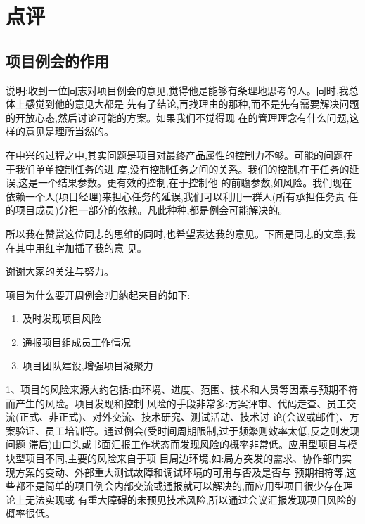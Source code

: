 \documentclass[11pt]{article}
\begin{document}
\pagebreak
\section{点评}

\subsection{项目例会的作用}

\begin{statement}
  说明:收到一位同志对项目例会的意见,觉得他是能够有条理地思考的人。同时,我总体上感觉到他的意见大都是
  先有了结论,再找理由的那种,而不是先有需要解决问题的开放心态,然后讨论可能的方案。如果我们不觉得现
  在的管理理念有什么问题,这样的意见是理所当然的。

  在中兴的过程之中,其实问题是项目对最终产品属性的控制力不够。可能的问题在于我们单单控制任务的进
  度,没有控制任务之间的关系。我们的控制,在于任务的延误,这是一个结果参数。更有效的控制,在于控制他
  的前瞻参数,如风险。我们现在依赖一个人(项目经理)来担心任务的延误,我们可以利用一群人(所有承担任务责
  任的项目成员)分担一部分的依赖。凡此种种,都是例会可能解决的。

  所以我在赞赏这位同志的思维的同时,也希望表达我的意见。下面是同志的文章,我在其中用红字加插了我的意
  见。

  谢谢大家的关注与努力。
\end{statement}

\begin{myquote}
项目为什么要开周例会?归纳起来目的如下:
\begin{enumerate}
    \item 及时发现项目风险
    \item 通报项目组成员工作情况
    \item 项目团队建设,增强项目凝聚力
\end{enumerate}

1、项目的风险来源大约包括:由环境、进度、范围、技术和人员等因素与预期不符而产生的风险。项目发现和控制
风险的手段非常多:方案评审、代码走查、员工交流(正式、非正式)、对外交流、技术研究、测试活动、技术讨
论(会议或邮件)、方案验证、员工培训等。通过例会(受时间周期限制,过于频繁则效率太低,反之则发现问题
滞后)由口头或书面汇报工作状态而发现风险的概率非常低。应用型项目与模块型项目不同,主要的风险来自于项
目周边环境,如:局方突发的需求、协作部门实现方案的变动、外部重大测试故障和调试环境的可用与否及是否与
预期相符等,这些都不是简单的项目例会内部交流或通报就可以解决的,而应用型项目很少存在理论上无法实现或
有重大障碍的未预见技术风险,所以通过会议汇报发现项目风险的概率很低。
\end{myquote}
\end{document}
